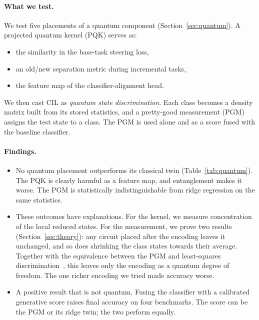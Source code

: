 \paragraph{What we test.}
We test five placements of a quantum component (Section~\ref{sec:quantum}).
A projected quantum kernel (PQK) serves as:
\begin{itemize}
  \item the similarity in the base-task steering loss,
  \item an old/new separation metric during incremental tasks,
  \item the feature map of the classifier-alignment head.
\end{itemize}
We then cast CIL as \emph{quantum state discrimination}. Each class becomes
a density matrix built from its stored statistics, and a pretty-good
measurement (PGM) assigns the test state to a class. The PGM is used alone
and as a score fused with the baseline classifier.

\paragraph{Findings.}
\begin{itemize}
  \item No quantum placement outperforms its classical twin
    (Table~\ref{tab:quantum}). The PQK is clearly harmful as a feature map,
    and entanglement makes it worse. The PGM is statistically
    indistinguishable from ridge regression on the same statistics.
  \item These outcomes have explanations. For the kernel, we measure
    concentration of the local reduced states. For the measurement, we prove
    two results (Section~\ref{sec:theory}): any circuit placed after the
    encoding leaves it unchanged, and so does shrinking the class states
    towards their average. Together with the equivalence between the PGM
    and least-squares discrimination~\cite{eldar2001srm}, this leaves only
    the encoding as a quantum degree of freedom. The one richer encoding
    we tried made accuracy worse.
  \item A positive result that is not quantum. Fusing the classifier with a
    calibrated generative score raises final accuracy on four benchmarks.
    The score can be the PGM or its ridge twin; the two perform equally.
\end{itemize}
